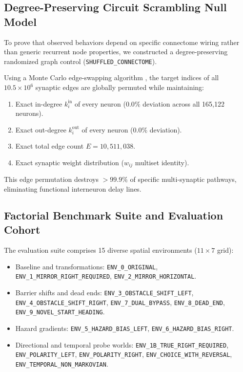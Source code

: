 \documentclass[10pt,letterpaper]{article}
\begin{document}
\subsection{Degree-Preserving Circuit Scrambling Null Model}

To prove that observed behaviors depend on specific connectome wiring rather than generic recurrent node properties, we constructed a degree-preserving randomized graph control (\texttt{SHUFFLED\_CONNECTOME}). 

Using a Monte Carlo edge-swapping algorithm \cite{milo2002network, masuda2019detecting}, the target indices of all $10.5\times 10^6$ synaptic edges are globally permuted while maintaining:
\begin{enumerate}
    \item Exact in-degree $k_i^{\text{in}}$ of every neuron ($0.0\%$ deviation across all 165,122 neurons).
    \item Exact out-degree $k_i^{\text{out}}$ of every neuron ($0.0\%$ deviation).
    \item Exact total edge count $E = 10,511,038$.
    \item Exact synaptic weight distribution ($w_{ij}$ multiset identity).
\end{enumerate}
This edge permutation destroys $>99.9\%$ of specific multi-synaptic pathways, eliminating functional interneuron delay lines.

\subsection{Factorial Benchmark Suite and Evaluation Cohort}

The evaluation suite comprises 15 diverse spatial environments ($11 \times 7$ grid):
\begin{itemize}
    \item Baseline and transformations: \texttt{ENV\_0\_ORIGINAL}, \texttt{ENV\_1\_MIRROR\_RIGHT\_REQUIRED}, \texttt{ENV\_2\_MIRROR\_HORIZONTAL}.
    \item Barrier shifts and dead ends: \texttt{ENV\_3\_OBSTACLE\_SHIFT\_LEFT}, \texttt{ENV\_4\_OBSTACLE\_SHIFT\_RIGHT}, \texttt{ENV\_7\_DUAL\_BYPASS}, \texttt{ENV\_8\_DEAD\_END}, \texttt{ENV\_9\_NOVEL\_START\_HEADING}.
    \item Hazard gradients: \texttt{ENV\_5\_HAZARD\_BIAS\_LEFT}, \texttt{ENV\_6\_HAZARD\_BIAS\_RIGHT}.
    \item Directional and temporal probe worlds: \texttt{ENV\_1B\_TRUE\_RIGHT\_REQUIRED}, \texttt{ENV\_POLARITY\_LEFT}, \texttt{ENV\_POLARITY\_RIGHT}, \texttt{ENV\_CHOICE\_WITH\_REVERSAL}, \texttt{ENV\_TEMPORAL\_NON\_MARKOVIAN}.
\end{itemize}
\end{document}
